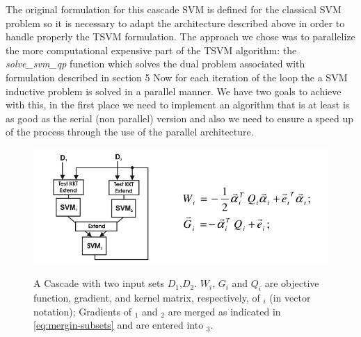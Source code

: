 The original formulation for this cascade SVM is defined for the classical
SVM problem so it is necessary to adapt the architecture described
above in order to handle properly the TSVM formulation. 
The approach we chose was to  parallelize the more computational expensive
part of the TSVM algorithm: the \emph{solve\_svm\_qp} function which
solves the dual problem associated with formulation described in section 5 %
Now for each iteration of the loop the a SVM inductive problem is solved in a parallel manner. We
have two goals to achieve with this, in the first place we need to
implement an algorithm that is at least is as good as the serial (non
parallel) version and also we need to ensure a speed up of the process
through the use of the parallel architecture.
%
\begin{figure}
\begin{centering}
\includegraphics[scale=0.5]{images/graf-svm-cascade-of-3}\label{fig:graf-3-svm}
\par\end{centering}
\begin{centering}
\caption{A Cascade with two input sets $D_{1}$,$D_{2}$. $W_{i}$, $G_{i}$
and $Q_{i}$ are objective function, gradient, and kernel matrix,
respectively, of $_{i}$ (in vector notation); Gradients
of $_{1}$ and $_{2}$ are merged as indicated
in \ref{eq:mergin-subsets} and are entered into $_{3}$.
\cite{GrafCBDV04}}
\par\end{centering}
\end{figure}
%
